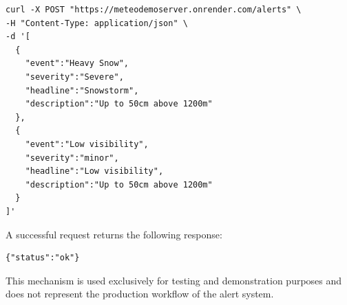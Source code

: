 {\small
\begin{verbatim}
curl -X POST "https://meteodemoserver.onrender.com/alerts" \
-H "Content-Type: application/json" \
-d '[
  {
    "event":"Heavy Snow",
    "severity":"Severe",
    "headline":"Snowstorm",
    "description":"Up to 50cm above 1200m"
  },
  {
    "event":"Low visibility",
    "severity":"minor",
    "headline":"Low visibility",
    "description":"Up to 50cm above 1200m"
  }
]'
\end{verbatim}
}
A successful request returns the following response:
\begin{verbatim}
{"status":"ok"}
\end{verbatim}
This mechanism is used exclusively for testing and demonstration purposes and does not represent the production workflow of the alert system.






